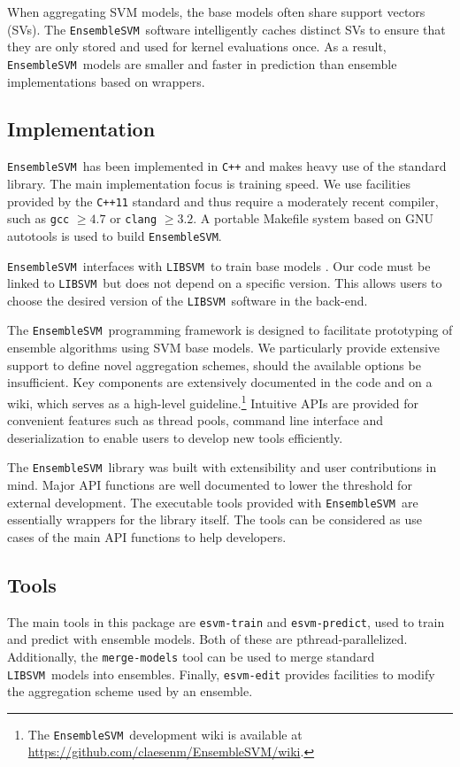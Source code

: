 \documentclass[twoside,11pt]{article}
\newcommand{\esvm}{\texttt{\selectfont EnsembleSVM}}
\newcommand{\libsvm}{\texttt{LIBSVM}}
\begin{document}
When aggregating SVM models, the base models often share support
vectors (SVs). The \esvm\ software intelligently caches distinct SVs to ensure
that they are only stored and used for kernel evaluations once. As a result,
\esvm\ models are smaller and faster in prediction than ensemble implementations based on wrappers.

\subsection{Implementation}
\esvm\ has been implemented in \texttt{C++} and makes heavy use of the standard library. The main implementation focus is training speed. We use facilities provided by the \texttt{C++11} standard and thus require a moderately recent compiler, such as \texttt{gcc} $\geq4.7$ or \texttt{clang} $\geq 3.2$. A portable Makefile system based on GNU autotools is used to build \esvm. 

\esvm\ interfaces with \libsvm\ to train base models \citep{CC01a}. Our code must be linked to \libsvm\ but does not depend on a specific version. This allows users to choose the desired version of the \libsvm\ software in the back-end. 

The \esvm\ programming framework is designed to facilitate prototyping of ensemble algorithms using SVM base models.
We particularly provide extensive support to define novel aggregation schemes, should the available options be insufficient. 
Key components are extensively documented in the code and on a wiki, which serves as a high-level guideline.\footnote{The \esvm\ development wiki is available at \url{https://github.com/claesenm/EnsembleSVM/wiki}.} Intuitive APIs are provided for convenient features such as thread pools, command line interface and deserialization to enable users to develop new tools efficiently.

\newpage
{\noindent}The \esvm\ library was built with extensibility and user
contributions in mind.
Major API functions are well documented to lower the threshold
for external development. The executable tools provided with \esvm\ are
essentially wrappers for the library itself. The tools can be considered as use
cases of the main API functions to help developers.

\subsection{Tools}
The main tools in this package are {\tt esvm-train} and {\tt esvm-predict}, used
to train and predict with ensemble models. Both of these are pthread-parallelized. 
Additionally, the {\tt merge-models} tool can be used to merge standard \libsvm\ models into ensembles. 
Finally, {\tt esvm-edit} provides facilities to modify the aggregation scheme used by an ensemble.
\end{document}
